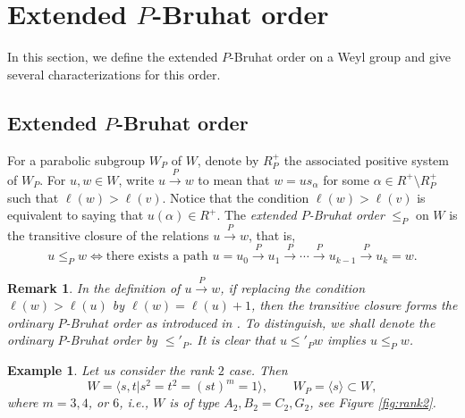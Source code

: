 \documentclass[12pt]{amsart}
\newtheorem{Eg}[Th]{Example}
\newtheorem{Rmk}[Th]{Remark}
\begin{document}
\section{Extended $P$-Bruhat order}\label{JUY-i}

In this section, we define the {extended $P$-Bruhat order} on a Weyl group and give several  characterizations for this order. 

\subsection{Extended $P$-Bruhat order}
 For a parabolic subgroup  $W_P$ of $W$, denote by $R^+_P$ the associated  positive system of $W_P$. 
For $u, w\in W$, write $u\stackrel{P}\to w$ to mean that $w=us_{\alpha}$ for some $\alpha\in R^+\setminus R^+_P$ such that $\ell(w)>\ell(v)$. 
Notice that the condition $\ell(w)>\ell(v)$ is equivalent to saying that $u(\alpha)\in R^+$. 
The \emph{extended $P$-Bruhat order} $\leq_P$ on $W$ is  the transitive closure of the relations $u\stackrel{P}\to w$, 
that is,
$$u\leq_P w\iff \text{there exists a path }
u=u_0\stackrel{P}\to u_1\stackrel{P}\to \cdots\stackrel{P}\to u_{k-1}\stackrel{P}\to u_k= w.$$

 
\begin{Rmk}
In the definition of $u\stackrel{P}\to w$, if replacing the condition $\ell(w)>\ell(u)$ by $\ell(w)=\ell(u)+1$, then the transitive closure forms the ordinary $P$-Bruhat order as introduced in \cite{KLS-Proj}. To distinguish, we shall denote the ordinary $P$-Bruhat order by $\leq'_P$. 
It is clear that $u\leq'_P w$ implies $u\leq_P w$. 
\end{Rmk}




\begin{Eg}
Let us consider the rank $2$ case.
Then
$$W=\langle s,t|s^2=t^2=(st)^m=1\rangle,\qquad W_P=\langle s\rangle \subset W,$$
where $m=3, 4$, or $6$, i.e., $W$ is of type $A_2,B_2=C_2,G_2$, 
see Figure \ref{fig:rank2}.
\end{Eg}
\end{document}
